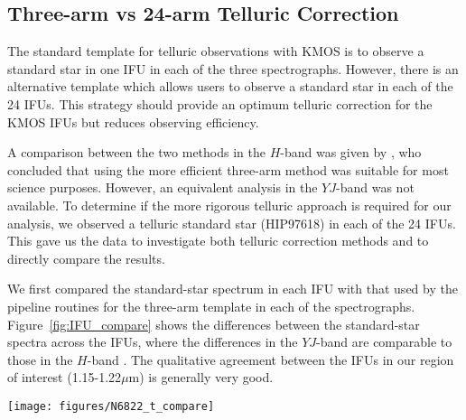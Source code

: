 \documentclass[iop]{emulateapj}
\begin{document}
\subsection{Three-arm vs 24-arm Telluric Correction} %
\label{sub:three_arm_vs_24_arm_telluric_correction}

The standard template for telluric observations with KMOS is to observe a standard star in one IFU in each of the three spectrographs.
However, there is an alternative template which allows users to observe a standard star in each of the 24 IFUs.
This strategy should provide an optimum telluric correction for the KMOS IFUs but reduces observing efficiency.

A comparison between the two methods in the $H$-band was given by
\cite{2013A&A...558A..56D},
who concluded that using the more efficient three-arm method was suitable for most science purposes.
However, an equivalent analysis in the $YJ$-band was not available.
To determine if the more rigorous telluric approach is required for our analysis,
we observed a telluric standard star (HIP97618) in each of the 24 IFUs.
This gave us the data to investigate both telluric correction methods and to directly compare the results.

We first compared the standard-star spectrum in each IFU with that used by the pipeline routines for the three-arm template in each of the spectrographs.
Figure~\ref{fig:IFU_compare} shows the differences between the standard-star spectra across the IFUs,
where the differences in the $YJ$-band are comparable to those in the $H$-band
\cite[cf. Fig.7 from][]{2013A&A...558A..56D}.
The qualitative agreement between the IFUs in our region of interest (1.15-1.22$\mu$m) is generally very good.


\begin{figure*}
 \begin{center}
 \texttt{[image: figures/N6822\_t\_compare]}
 \caption{
    Comparison of $J$-band spectra of the same standard star in each IFU.
    The ratio of each spectrum compared to that from the IFU used in the three-arm telluric method is shown,
    with their respective mean and standard deviation ($\mu$ and $\sigma$).
    Red lines indicate $\mu$~=~1.0, $\sigma$~=~0.0 for each ratio.
    The blue shaded area signifies the region used in our analysis,
    within which, the discrepancies between the IFUs are generally small.
    This is reflected in the standard deviation values when only considering this region.
    (IFUs 13 and 16 are omitted as no data were taken with these IFUs.) \label{fig:IFU_compare}
          }
 \end{center}
\end{figure*}
\end{document}
